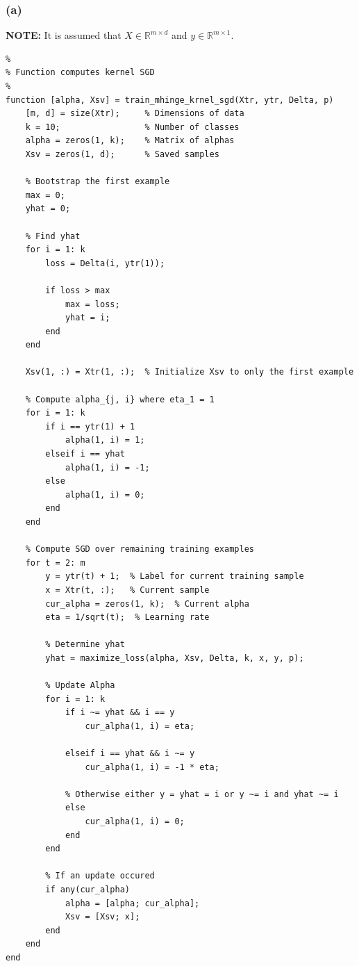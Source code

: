 \documentclass[11pt, oneside]{article}   	%
\begin{document}
\subsubsection{(a)}
\textbf{NOTE:} It is assumed that $X \in \mathbb{R}^{m \times d}$ and $y \in \mathbb{R}^{m \times 1}$.
\begin{verbatim}
%
% Function computes kernel SGD
%
function [alpha, Xsv] = train_mhinge_krnel_sgd(Xtr, ytr, Delta, p)
    [m, d] = size(Xtr);     % Dimensions of data
    k = 10;                 % Number of classes
    alpha = zeros(1, k);    % Matrix of alphas
    Xsv = zeros(1, d);      % Saved samples
    
    % Bootstrap the first example
    max = 0;
    yhat = 0;
    
    % Find yhat
    for i = 1: k
        loss = Delta(i, ytr(1));
        
        if loss > max
            max = loss;
            yhat = i;
        end
    end
    
    Xsv(1, :) = Xtr(1, :);  % Initialize Xsv to only the first example
    
    % Compute alpha_{j, i} where eta_1 = 1
    for i = 1: k
        if i == ytr(1) + 1
            alpha(1, i) = 1;
        elseif i == yhat
            alpha(1, i) = -1;
        else
            alpha(1, i) = 0;
        end
    end
    
    % Compute SGD over remaining training examples
    for t = 2: m
        y = ytr(t) + 1;  % Label for current training sample
        x = Xtr(t, :);   % Current sample
        cur_alpha = zeros(1, k);  % Current alpha
        eta = 1/sqrt(t);  % Learning rate
        
        % Determine yhat
        yhat = maximize_loss(alpha, Xsv, Delta, k, x, y, p);
        
        % Update Alpha
        for i = 1: k
            if i ~= yhat && i == y
                cur_alpha(1, i) = eta;
            
            elseif i == yhat && i ~= y
                cur_alpha(1, i) = -1 * eta;
            
            % Otherwise either y = yhat = i or y ~= i and yhat ~= i
            else 
                cur_alpha(1, i) = 0;
            end
        end
        
        % If an update occured
        if any(cur_alpha)
            alpha = [alpha; cur_alpha];
            Xsv = [Xsv; x];
        end
    end
end











\end{verbatim}
\end{document}
